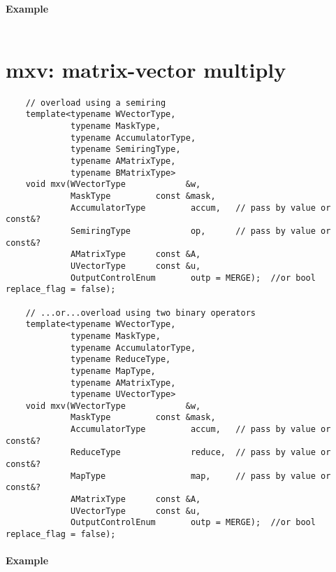 \paragraph{Example}

\begin{verbatim}

\end{verbatim}

\section{{\sf mxv}: matrix-vector multiply}

\paragraph{\syntax}

\begin{verbatim}
    // overload using a semiring
    template<typename WVectorType,
             typename MaskType,
             typename AccumulatorType,
             typename SemiringType,
             typename AMatrixType,
             typename BMatrixType>
    void mxv(WVectorType            &w,
             MaskType         const &mask,
             AccumulatorType         accum,   // pass by value or const&?
             SemiringType            op,      // pass by value or const&?
             AMatrixType      const &A,
             UVectorType      const &u,
             OutputControlEnum       outp = MERGE);  //or bool replace_flag = false);

    // ...or...overload using two binary operators
    template<typename WVectorType,
             typename MaskType,
             typename AccumulatorType,
             typename ReduceType,
             typename MapType,
             typename AMatrixType,
             typename UVectorType>
    void mxv(WVectorType            &w,
             MaskType         const &mask,
             AccumulatorType         accum,   // pass by value or const&?
             ReduceType              reduce,  // pass by value or const&?
             MapType                 map,     // pass by value or const&?
             AMatrixType      const &A,
             UVectorType      const &u,
             OutputControlEnum       outp = MERGE);  //or bool replace_flag = false);
\end{verbatim}


\paragraph{Example}

